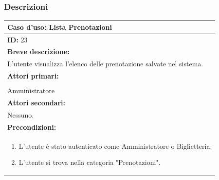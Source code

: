 \documentclass{article}
\begin{document}
            \subsubsection{Descrizioni}
                \begin{table}[H]
                    \begin{tabular}{|p{\linewidth}|}
                        \hline
                        \cellcolor{gray!100}
                        \color{white}
                        \centerline{\textbf{Caso d'uso:} Lista Prenotazioni} \\
                        \hline
                        \textbf{ID:} 23 \\
                        \hline
                        \cellcolor{gray!20}
                        \textbf{Breve descrizione:} \\
                        \cellcolor{gray!20}                        
                        L'utente visualizza l'elenco delle prenotazione salvate nel sistema. \\
                        \hline
                        \textbf{Attori primari:} \\
                        \begin{minipage}{\linewidth}
                            Biglietteria \\
                            Amministratore
                        \end{minipage}
                        \vspace {-5pt} \\
                        \hline
                        \textbf{Attori secondari:} \\                        
                        Nessuno. \\
                        \hline
                        \cellcolor{gray!20}
                        \textbf{Precondizioni:} \\
                        \cellcolor{gray!20}
                        \begin{minipage}{\linewidth}
                            \begin{enumerate}
                                \item L'utente è stato autenticato come Amministratore o Biglietteria.
                                \item L'utente si trova nella categoria "Prenotazioni".
                            \end{enumerate}

\end{minipage}
\end{tabular}
\end{table}
\end{document}
